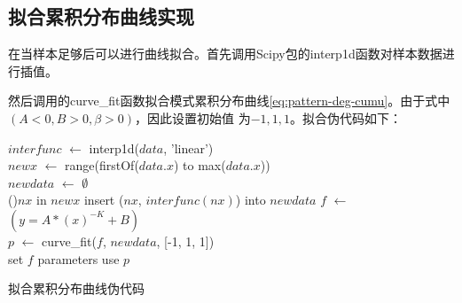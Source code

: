 \documentclass[master]{thesis-uestc}
\begin{document}
\subsection{拟合累积分布曲线实现}
\label{subsec:fit-formula-impl}

    在当样本足够后可以进行曲线拟合。首先调用Scipy包的interp1d函数对样本数据进行插值。

\begin{table}
    \caption{拟合累积分布曲线调用函数}
    \label{tab:fit-func}
\end{table}

    然后调用的curve\_fit函数拟合模式累积分布曲线\ref{eq:pattern-deg-cumu}。由于式中$(A < 0, B > 0, \beta > 0)$，因此设置初始值
为$-1, 1, 1$。拟合伪代码如下：

\begin{algorithm}
    $interfunc$ $\leftarrow$ interp1d($data$, 'linear')\\
    $newx$ $\leftarrow$ range(firstOf($data.x$) to max($data.x$))\\
    $newdata$ $\leftarrow$ $\emptyset$\\
    \For(){$nx$ in $newx$}{
        insert ($nx$, $interfunc(nx)$) into $newdata$
    }
    $f$ $\leftarrow$ $(y = A*(x)^{-K}+B)$\\

    $p$ $\leftarrow$ curve\_fit($f$, $newdata$, [-1, 1, 1]) \\
    set $f$ parameters use $p$\\
    \caption{拟合累积分布曲线伪代码}
    \label{alg:fit-formula}
\end{algorithm}
\end{document}
